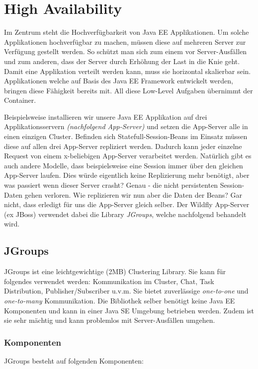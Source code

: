 \chapter{High Availability}
Im Zentrum steht die Hochverfügbarkeit von Java EE Applikationen. Um solche Applikationen hochverfügbar zu machen, müssen diese auf mehreren Server zur Verfügung gestellt werden. So schützt man sich zum einem vor Server-Ausfällen und zum anderen, dass der Server durch Erhöhung der Last in die Knie geht. Damit eine Applikation verteilt werden kann, muss sie horizontal skalierbar sein. Applikationen welche auf Basis des Java EE Framework entwickelt werden, bringen diese Fähigkeit bereits mit. All diese Low-Level Aufgaben übernimmt der Container.

Beispielsweise installieren wir unsere Java EE Applikation auf drei Applikationsservern \emph{(nachfolgend App-Server)} und setzen die App-Server alle in einen einzigen Cluster. Befinden sich Statefull-Session-Beans im Einsatz müssen diese auf allen drei App-Server repliziert werden. Dadurch kann jeder einzelne Request von einem x-beliebigen App-Server verarbeitet werden. Natürlich gibt es auch andere Modelle, dass beispielsweise eine Session immer über den gleichen App-Server laufen. Dies würde eigentlich keine Replizierung mehr benötigt, aber was passiert wenn dieser Server crasht? Genau - die nicht persistenten Session-Daten gehen verloren. Wie replizieren wir nun aber die Daten der Beans? Gar nicht, dass erledigt für uns die App-Server gleich selber. Der Wildfly App-Server (ex JBoss) verwendet dabei die Library \emph{JGroups}, welche nachfolgend behandelt wird.

\section{JGroups}
JGroups ist eine leichtgewichtige (2MB) Clustering Library. Sie kann für folgendes verwendet werden: Kommunikation im Cluster, Chat, Task Distribution, Publisher/Subscriber u.v.m. Sie bietet zuverlässige \emph{one-to-one} und \emph{one-to-many} Kommunikation. Die Bibliothek selber benötigt keine Java EE Komponenten und kann in einer Java SE Umgebung betrieben werden. Zudem ist sie sehr mächtig und kann problemlos mit Server-Ausfällen umgehen.

\subsection{Komponenten}

JGroups besteht auf folgenden Komponenten:

